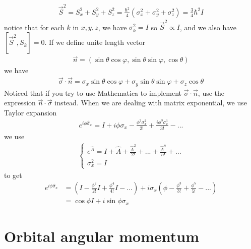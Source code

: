 \documentclass[UTF8,12pt]{article} %
\begin{document}
\begin{align}
\vec{S}^{2} = S_{x}^{2} + S_{y}^{2} + S_{z}^{2} = \frac{\hbar^{2}}{4} \left(\sigma_{x}^{2} + \sigma_{y}^{2} + \sigma_{z}^{2}\right) = \frac{3}{4} \hbar^{2} I
\end{align}
notice that for each $k$ in $x, y, z$, we have $\boxed{\sigma_{k}^{2} = I}$ so $\vec{S}^{2} \propto I$, and we also have $\boxed{[\vec{S}^{2}, S_{k}] = 0}$. If we define unite length vector
\begin{align}
\vec{n} = (\sin\theta\cos\varphi, \sin\theta\sin\varphi, \cos\theta)
\end{align}
we have
\begin{align}
\vec{\sigma}\cdot\vec{n} = \sigma_{x}\sin\theta\cos\varphi + \sigma_{y}\sin\theta\sin\varphi + \sigma_{z}\cos\theta
\end{align}
Noticed that if you try to use Mathematica to implement $\vec{\sigma}\cdot\vec{n}$, use the expression $\vec{n}\cdot\vec{\sigma}$ instead. When we are dealing with matrix exponential, we use Taylor expansion
\begin{align}
e^{i\phi\hat{\sigma}_{x}} = I + i\phi \sigma_{x} - \frac{\phi^{2}\sigma_{x}^{2}}{2!} + \frac{i\phi^{3}\sigma_{x}^{3}}{3!} - ...
\end{align}
we use
\begin{align}
\begin{cases}
e^{\hat{A}} = I + \hat{A} + \frac{\hat{A}^{2}}{2!} + ... + \frac{\hat{A}^{n}}{n!} + ...\\
\sigma_{x}^{2} = I
\end{cases}
\end{align}
to get
\begin{align}
e^{i\phi\hat{\sigma}_{x}} &= \left(I - \frac{\phi^{2}}{2!}I + \frac{\phi^{4}}{4!}I - ...\right) + i\sigma_{x} \left(\phi - \frac{\phi^{3}}{3!} + \frac{\phi^{5}}{5!} - ...\right) \\
&= \cos\phi I + i\sin\phi\sigma_{x}
\end{align}

\section{Orbital angular momentum}
\end{document}
